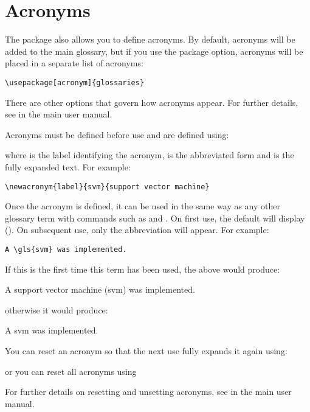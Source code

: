 \documentclass{nlctdoc}
\begin{document}
\section{Acronyms}
\label{acronyms}

The  package also allows you to define acronyms.
By default, acronyms will be added to the main glossary, but if
you use the  package option, acronyms will be
placed in a separate list of acronyms:
\begin{verbatim}
\usepackage[acronym]{glossaries}
\end{verbatim}
There are other options that govern how acronyms appear. For further
details, see 
in
the main  user manual.

Acronyms must be defined before use and are defined using:
\begin{definition}
\end{definition}
where  is the label identifying the acronym, 
is the abbreviated form and  is the fully expanded text.
For example:
\begin{verbatim}
\newacronym{label}{svm}{support vector machine}
\end{verbatim}

Once the acronym is defined, it can be used in the same way as 
any other glossary term with commands such as  and
. On first use, the default will display 
(). On subsequent use, only the abbreviation will
appear. For example:
\begin{verbatim}
A \gls{svm} was implemented.
\end{verbatim}
If this is the first time this term has been used, the above would 
produce:
\begin{display}
A support vector machine (svm) was implemented.
\end{display}
otherwise it would produce:
\begin{display}
A svm was implemented.
\end{display}
You can reset an acronym so that the next use fully 
expands it again using:
\begin{definition}
\end{definition}
or you can reset all acronyms using
\begin{definition}
\end{definition}
For further details on resetting and unsetting acronyms, see
in the main  user manual.
\end{document}
